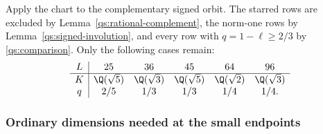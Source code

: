 Apply the chart to the complementary signed orbit. The starred rows
are excluded by Lemma~\ref{qs:rational-complement}, the norm-one rows
by Lemma~\ref{qs:signed-involution}, and every row with
$q=1-\ell\ge2/3$ by \eqref{qs:comparison}. Only the following cases remain:
\begin{equation}\label{qs:five-cases}
\begin{array}{c|ccccc}
L&25&36&45&64&96\\\hline
K&\Q(\sqrt5)&\Q(\sqrt3)&\Q(\sqrt5)&
\Q(\sqrt2)&\Q(\sqrt3)\\
q&2/5&1/3&1/3&1/4&1/4.
\end{array}
\end{equation}

\subsubsection{Ordinary dimensions needed at the small endpoints}


